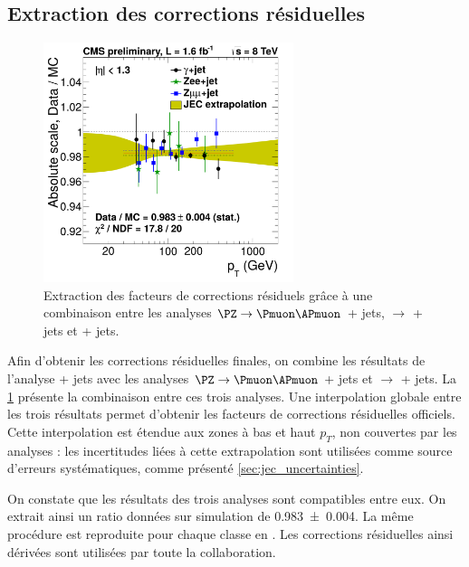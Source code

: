\subsection{Extraction des corrections résiduelles}

\begin{figure}[tbp]
  \centering
  \includegraphics[width=0.65\textwidth]{chapitre4/figs/jec_residuals_combined.pdf}
  \caption{Extraction des facteurs de corrections résiduels grâce à une combinaison entre les analyses $\PZ \rightarrow \Pmuon \APmuon$ + jets, \PZ $\rightarrow$ \Pelectron \APelectron + jets et \Pphoton + jets.}
  \label{fig:jec_residuals_combined}
\end{figure}


Afin d'obtenir les corrections résiduelles finales, on combine les résultats de l'analyse \Pphoton + jets avec les analyses $\PZ \rightarrow \Pmuon \APmuon$ + jets et \PZ $\rightarrow$ \Pelectron \APelectron + jets. La \cref{fig:jec_residuals_combined} présente la combinaison entre ces trois analyses. Une interpolation globale entre les trois résultats permet d'obtenir les facteurs de corrections résiduelles officiels. Cette interpolation est étendue aux zones à bas et haut $p_T$, non couvertes par les analyses : les incertitudes liées à cette extrapolation sont utilisées comme source d'erreurs systématiques, comme présenté \cref{sec:jec_uncertainties}.

\bigskip

On constate que les résultats des trois analyses sont compatibles entre eux. On extrait ainsi un ratio données sur simulation de \SI{0.983 \pm 0.004}{}. La même procédure est reproduite pour chaque classe en \aeta. Les corrections résiduelles ainsi dérivées sont utilisées par toute la collaboration.

